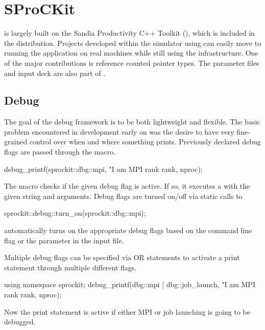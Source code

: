 
\chapter{SProCKit}\label{chapter:sprockit}
\sstmacro is largely built on the Sandia Productivity C++ Toolkit (\sprockit),
which is included in the \sstmacro distribution.
Projects developed within the simulator using \sprockit can easily 
move to running the application on real machines while still using the \sprockit infrastructure.
One of the major contributions is reference counted pointer types.
The parameter files and input deck are also part of \sprockit.

\section{Debug}\label{sec:debug}
The goal of the \sprockit debug framework is to be both lightweight and flexible.
The basic problem encountered in \sstmacro development early on was the desire to have very fine-grained control over when and where something prints.
Previously declared debug flags are passed through the  macro.

\begin{CppCode}
debug_printf(sprockit::dbg::mpi,
  "I am MPI rank %
  rank, nproc);
\end{CppCode}

The macro checks if the given debug flag is active. 
If so, it executes a  with the given string and arguments.
Debug flags are turned on/off via static calls to

\begin{CppCode}
sprockit::debug::turn_on(sprockit::dbg::mpi);
\end{CppCode}

\sstmacro automatically turns on the appropriate debug flags based on the  command line flag
or the  parameter in the input file.

Multiple debug flags can be specified via OR statements to activate a print statement through multiple different flags.

\begin{CppCode}
using namespace sprockit;
debug_printf(dbg::mpi | dbg::job_launch,
  "I am MPI rank %
  rank, nproc);
\end{CppCode}

Now the print statement is active if either MPI or job launching is going to be debugged.

